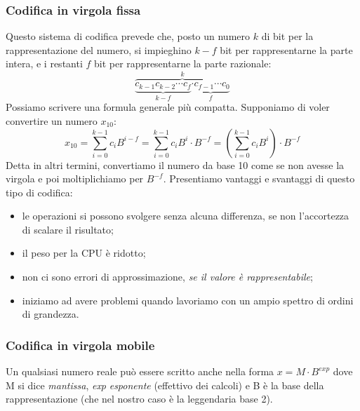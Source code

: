 \documentclass[class=book, crop=false, oneside]{standalone}
\begin{document}
\subsubsection{Codifica in virgola fissa} Questo sistema di codifica prevede che, posto un numero \(k\) di bit per la rappresentazione del numero, si impieghino \(k-f\) bit per rappresentarne la parte intera, e i restanti \(f\) bit per rappresentarne la parte razionale:
\begin{equation*}
	\overbrace{\underbrace{c_{k-1}c_{k-2}\cdots c_{f}}_\text{$k-f$}\underbrace{\cdot c_{f-1}\cdots c_{0}}_\text{$f$}}^\text{$k$}
\end{equation*}
Possiamo scrivere una formula generale più compatta. Supponiamo di voler convertire un numero $x_{10}$:
\begin{equation*}
 	x_{10}=\sum_{i=0}^{k-1} c_{i}B^{i-f}=\sum_{i=0}^{k-1} c_{i}B^{i}\cdot B^{-f}=(\sum_{i=0}^{k-1} c_{i}B^{i})\cdot B^{-f}
 \end{equation*}
Detta in altri termini, convertiamo il numero da base 10 come se non avesse la virgola e poi moltiplichiamo per \(B^{-f}\). Presentiamo vantaggi e svantaggi di questo tipo di codifica:
\begin{itemize}[noitemsep]
	\item le operazioni si possono svolgere senza alcuna differenza, se non l'accortezza di scalare il risultato;
	\item il peso per la CPU è ridotto;
	\item non ci sono errori di approssimazione, \emph{se il valore è rappresentabile};
	\item iniziamo ad avere problemi quando lavoriamo con un ampio spettro di ordini di grandezza.
\end{itemize}

\subsubsection{Codifica in virgola mobile}
Un qualsiasi numero reale può essere scritto anche nella forma \(x=M\cdot B^{exp}\) dove M si dice \emph{mantissa}, \emph{exp} \emph{esponente} (effettivo dei calcoli) e B è la base della rappresentazione (che nel nostro caso è la leggendaria base 2).
\end{document}
